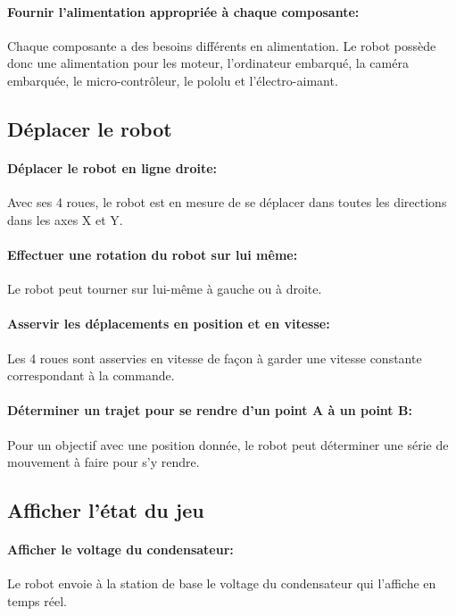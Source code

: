 \paragraph{Fournir l'alimentation appropriée à chaque composante:}
Chaque composante a des besoins différents en alimentation. Le robot possède donc une alimentation pour les moteur, l'ordinateur embarqué, la caméra embarquée, le micro-contrôleur, le pololu et l'électro-aimant.

\subsection{Déplacer le robot}

\paragraph{Déplacer le robot en ligne droite:}
Avec ses 4 roues, le robot est en mesure de se déplacer dans toutes les directions dans les axes X et Y.

\paragraph{Effectuer une rotation du robot sur lui même:}
Le robot peut tourner sur lui-même à gauche ou à droite.

\paragraph{Asservir les déplacements en position et en vitesse:}
Les 4 roues sont asservies en vitesse de façon à garder une vitesse constante correspondant à la commande.

\paragraph{Déterminer un trajet pour se rendre d'un point A à un point B:}
Pour un objectif avec une position donnée, le robot peut déterminer une série de mouvement à faire pour s'y rendre.

\subsection{Afficher l'état du jeu}

\paragraph{Afficher le voltage du condensateur:}
Le robot envoie à la station de base le voltage du condensateur qui l'affiche en temps réel.

